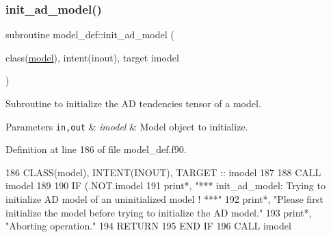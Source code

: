 \subsubsection{\texorpdfstring{init\+\_\+ad\+\_\+model()}{init\_ad\_model()}}
{\footnotesize\ttfamily subroutine model\+\_\+def\+::init\+\_\+ad\+\_\+model (\begin{DoxyParamCaption}\item[{class(\hyperlink{structmodel__def_1_1model}{model}), intent(inout), target}]{imodel }\end{DoxyParamCaption})\hspace{0.3cm}{\ttfamily [private]}}



Subroutine to initialize the AD tendencies tensor of a model. 


\begin{DoxyParams}[1]{Parameters}
\mbox{\tt in,out}  & {\em imodel} & Model object to initialize. \\
\hline
\end{DoxyParams}


Definition at line 186 of file model\+\_\+def.\+f90.


\begin{DoxyCode}
186     \textcolor{keywordtype}{CLASS}(model), \textcolor{keywordtype}{INTENT(INOUT)}, \textcolor{keywordtype}{TARGET} :: imodel
187 
188     \textcolor{keyword}{CALL }imodel%
189 
190     \textcolor{keywordflow}{IF} (.NOT.imodel%
191       print*, \textcolor{stringliteral}{"*** init\_ad\_model: Trying to initialize AD model of an uninitialized model ! ***"}
192       print*, \textcolor{stringliteral}{"Please first initialize the model before trying to initialize the AD model."}
193       print*, \textcolor{stringliteral}{"Aborting operation."}
194       \textcolor{keywordflow}{RETURN}
195 \textcolor{keywordflow}{    END IF}
196     \textcolor{keyword}{CALL }imodel%
\end{DoxyCode}
\mbox{\label{namespacemodel__def_a05a17769a10efe2dd18b5dfb94ac75a2}} 
